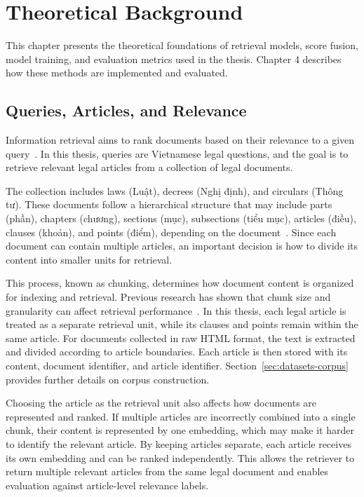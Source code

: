 \chapter{Theoretical Background}

This chapter presents the theoretical foundations of retrieval models, score fusion, model training, and evaluation metrics used in the thesis. Chapter 4 describes how these methods are implemented and evaluated.

\section{Queries, Articles, and Relevance}

Information retrieval aims to rank documents based on their relevance to a given query~\cite{manning2008}. In this thesis, queries are Vietnamese legal questions, and the goal is to retrieve relevant legal articles from a collection of legal documents.

The collection includes laws (Luật), decrees (Nghị định), and circulars (Thông tư). These documents follow a hierarchical structure that may include parts (phần), chapters (chương), sections (mục), subsections (tiểu mục), articles (điều), clauses (khoản), and points (điểm), depending on the document~\cite{gov2025structure}. Since each document can contain multiple articles, an important decision is how to divide its content into smaller units for retrieval.

This process, known as chunking, determines how document content is organized for indexing and retrieval. Previous research has shown that chunk size and granularity can affect retrieval performance~\cite{chen2024granularity}. In this thesis, each legal article is treated as a separate retrieval unit, while its clauses and points remain within the same article. For documents collected in raw HTML format, the text is extracted and divided according to article boundaries. Each article is then stored with its content, document identifier, and article identifier. Section~\ref{sec:datasets-corpus} provides further details on corpus construction.

Choosing the article as the retrieval unit also affects how documents are represented and ranked. If multiple articles are incorrectly combined into a single chunk, their content is represented by one embedding, which may make it harder to identify the relevant article. By keeping articles separate, each article receives its own embedding and can be ranked independently. This allows the retriever to return multiple relevant articles from the same legal document and enables evaluation against article-level relevance labels.

